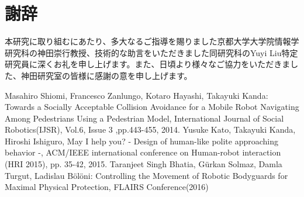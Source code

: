 \documentclass{kuisthesis}
\begin{document}
\section{謝辞}
本研究に取り組むにあたり、多大なるご指導を賜りました京都大学大学院情報学研究科の神田崇行教授、技術的な助言をいただきました同研究科のYuyi Liu特定研究員に深くお礼を申し上げます。また、日頃より様々なご協力をいただきました、神田研究室の皆様に感謝の意を申し上げます。

\begin{thebibliography}{3}
 Masahiro Shiomi, Francesco Zanlungo, Kotaro Hayashi, Takayuki Kanda: Towards a Socially Acceptable Collision Avoidance for a Mobile Robot Navigating Among Pedestrians Using a Pedestrian Model, International Journal of Social Robotics(IJSR), Vol.6, Issue 3 ,pp.443-455, 2014.
 Yusuke Kato, Takayuki Kanda, Hiroshi Ishiguro, May I help you? - Design of human-like polite approaching behavior -, ACM/IEEE international conference on Human-robot interaction (HRI 2015), pp. 35-42, 2015.
 Taranjeet Singh Bhatia, Gürkan Solmaz, Damla Turgut, Ladislau Bölöni: Controlling the Movement of Robotic Bodyguards for Maximal Physical Protection, FLAIRS Conference(2016)
\end{thebibliography}
\end{document}
